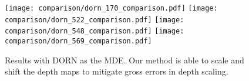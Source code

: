 \begin{figure}[H]
  \texttt{[image: comparison/dorn\_170\_comparison.pdf]}
  \texttt{[image: comparison/dorn\_522\_comparison.pdf]}
  \texttt{[image: comparison/dorn\_548\_comparison.pdf]}
  \texttt{[image: comparison/dorn\_569\_comparison.pdf]}
  \caption{Results with DORN as the MDE. Our method is able to scale and shift
    the depth maps to mitigate gross errors in depth scaling.}
  \label{fig:dorn_3}
\end{figure}
% 
% 

